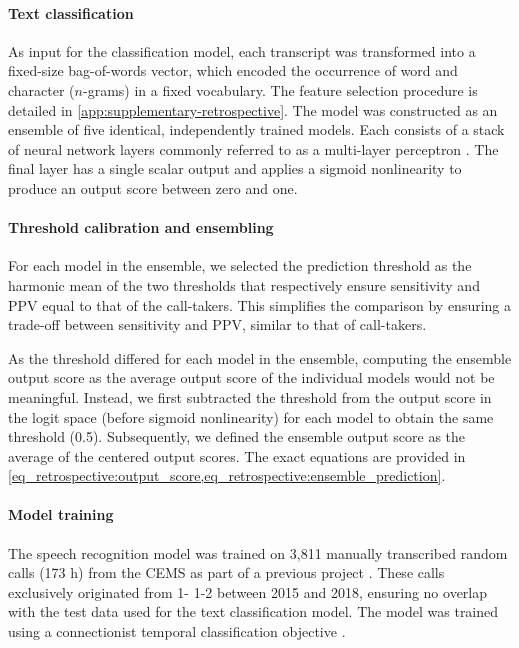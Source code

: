 {\paragraph{Text classification}

As input for the classification model, each transcript was transformed into a fixed-size bag-of-words vector, which encoded the occurrence of word and character ($n$-grams) in a fixed vocabulary. The feature selection procedure is detailed in \cref{app:supplementary-retrospective}. The model was constructed as an ensemble \parencite{hansen_neural_1990} of five identical, independently trained models. Each consists of a stack of neural network layers commonly referred to as a multi-layer perceptron \parencite{rosenblatt_perceptron_1958}. The final layer has a single scalar output and applies a sigmoid nonlinearity to produce an output score between zero and one.


\paragraph{Threshold calibration and ensembling}

For each model in the ensemble, we selected the prediction threshold as the harmonic mean of the two thresholds that respectively ensure sensitivity and PPV equal to that of the call-takers. This simplifies the comparison by ensuring a trade-off between sensitivity and PPV, similar to that of call-takers.

As the threshold differed for each model in the ensemble, computing the ensemble output score as the average output score of the individual models would not be meaningful. Instead, we first subtracted the threshold from the output score in the logit space (before sigmoid nonlinearity) for each model to obtain the same threshold (0.5). Subsequently, we defined the ensemble output score as the average of the centered output scores. The exact equations are provided in \cref{eq_retrospective:output_score,eq_retrospective:ensemble_prediction}.


\paragraph{Model training}

The speech recognition model was trained on 3,811 manually transcribed random calls (173 h) from the CEMS as part of a previous project \parencite{cite14}. These calls exclusively originated from 1- 1-2 between 2015 and 2018, ensuring no overlap with the test data used for the text classification model. The model was trained using a connectionist temporal classification objective \parencite{graves_connectionist_2006}.

}
